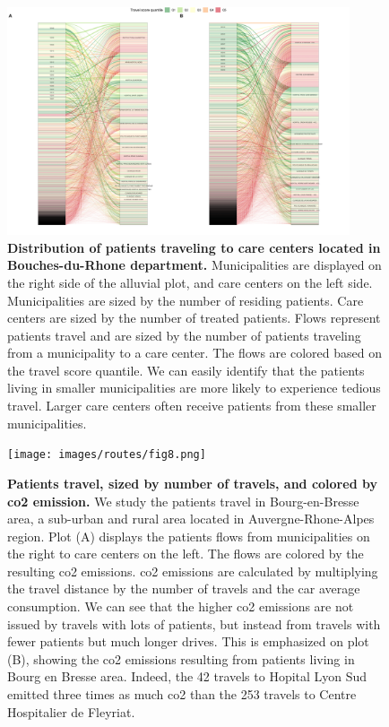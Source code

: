 \begin{figure}[H]
    \includegraphics[width=0.9\textwidth]{images/routes/fig6.png}
    \centering
    \caption{
        \textbf{Distribution of patients traveling to care centers located in Bouches-du-Rhone department.} Municipalities are displayed on the right side of the alluvial plot, and care centers on the left side. Municipalities are sized by the number of residing patients. Care centers are sized by the number of treated patients. Flows represent patients travel and are sized by the number of patients traveling from a municipality to a care center. The flows are colored based on the travel score quantile. We can easily identify that the patients living in smaller municipalities are more likely to experience tedious travel. Larger care centers often receive patients from these smaller municipalities.
    }
    \label{fig:routes-alluvial-13}
\end{figure}

\begin{figure}[H]
    \texttt{[image: images/routes/fig8.png]}
    \centering
    \caption{
        \textbf{Patients travel, sized by number of travels, and colored by \ac{co2} emission.} We study the patients travel in Bourg-en-Bresse area, a sub-urban and rural area located in Auvergne-Rhone-Alpes region. Plot (A) displays the patients flows from municipalities on the right to care centers on the left. The flows are colored by the resulting \ac{co2} emissions. \ac{co2} emissions are calculated by multiplying the travel distance by the number of travels and the car average consumption. We can see that the higher \ac{co2} emissions are not issued by travels with lots of patients, but instead from travels with fewer patients but much longer drives. This is emphasized on plot (B), showing the \ac{co2} emissions resulting from patients living in Bourg en Bresse area. Indeed, the 42 travels to Hopital Lyon Sud emitted three times as much \ac{co2} than the 253 travels to Centre Hospitalier de Fleyriat.
    }
    \label{fig:routes-co2-01}
\end{figure}
